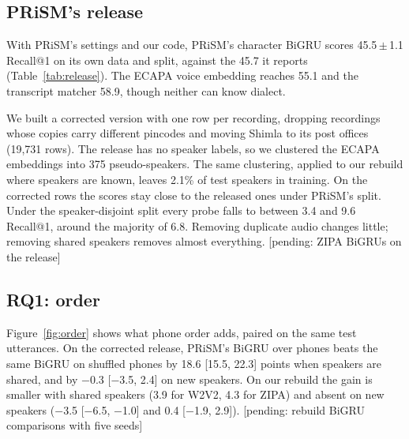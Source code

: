 \documentclass[11pt]{article}
\newcommand{\pending}[1]{{\color{red}[pending: #1]}}
\begin{document}
\begin{table}[t]
\centering\small
\begin{minipage}{0.8\textwidth}

\caption{Test Recall@1 on PRiSM's release (mean $\pm$ sd over seeds). The first column uses the data and split as
released, the second the corrected rows under PRiSM's split, and the third the corrected rows with new speakers,
found by clustering voices. The corrected rows keep one row per recording, drop conflicting labels and put Shimla
at its post offices.}
\label{tab:release}
\end{minipage}
\end{table}

\subsection{PRiSM's release}
With PRiSM's settings and our code, PRiSM's character BiGRU scores 45.5\,$\pm$\,1.1 Recall@1 on its own data and
split, against the 45.7 it reports (Table~\ref{tab:release}). The ECAPA voice
embedding reaches 55.1 and the transcript matcher 58.9, though neither can know dialect.

We built a corrected version with one row per recording, dropping recordings whose copies carry different
pincodes and moving Shimla to its post offices (19,731 rows). The release has no speaker labels, so we clustered
the ECAPA embeddings into 375 pseudo-speakers. The same clustering, applied to our rebuild where speakers are
known, leaves 2.1\% of test speakers in training. On the corrected rows the scores stay close to the released
ones under PRiSM's split. Under the speaker-disjoint split every probe falls to between 3.4 and 9.6 Recall@1,
around the majority of 6.8. Removing duplicate audio changes little; removing shared speakers removes almost
everything. \pending{ZIPA BiGRUs on the release}

\subsection{RQ1: order}
Figure~\ref{fig:order} shows what phone order adds, paired on the same test utterances. On the corrected release,
PRiSM's BiGRU over phones beats the same BiGRU on shuffled phones by 18.6 [15.5, 22.3] points when speakers are
shared, and by $-$0.3 [$-$3.5, 2.4] on new speakers. On our rebuild the gain is smaller with shared speakers
(3.9 for W2V2, 4.3 for ZIPA) and absent on new speakers ($-$3.5 [$-$6.5, $-$1.0] and 0.4 [$-$1.9, 2.9]).
\pending{rebuild BiGRU comparisons with five seeds}
\end{document}
